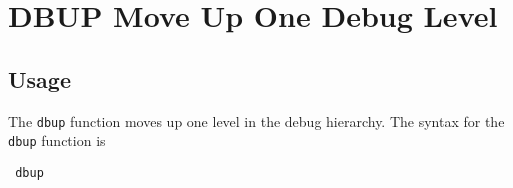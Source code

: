 \section{DBUP Move Up One Debug Level}

\subsection{Usage}

The \verb|dbup| function moves up one level in the debug
hierarchy.  The syntax for the \verb|dbup| function is
\begin{verbatim}
 dbup
\end{verbatim}
